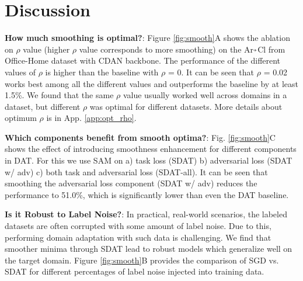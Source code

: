 \documentclass[table,dvipsnames]{article}
\newcommand{\veryshortarrow}[1][3pt]{\mathrel{\hbox{\rule[\dimexpr\fontdimen22\textfont2-.2pt\relax]{#1}{.4pt}}\mkern-4mu\hbox{\usefont{U}{lasy}{m}{n}\symbol{41}}}} \newcommand{\cmark}{\ding{51}}\newcommand{\xmark}{\ding{55}}\usepackage{amssymb}\usepackage{pifont}\usepackage[hyphens]{url}
\theoremstyle{plain}
\theoremstyle{definition}
\theoremstyle{remark}
\begin{document}
\section{Discussion}
\label{sec:discussion}
\textbf{How much smoothing is optimal?}: Figure \ref{fig:smooth}\textcolor{mydarkblue}{A} shows the ablation on $\rho$ value (higher $\rho$ value corresponds to more smoothing) on the Ar$\veryshortarrow$Cl from Office-Home dataset with CDAN backbone. The performance of the different values of $\rho$ is higher than the baseline with $\rho$ = 0. It can be seen that $\rho$ = 0.02 works best among all the different values and outperforms the baseline by at least 1.5\%. We found that the same $\rho$ value usually worked well across domains in a dataset, but different $\rho$ was optimal for different datasets. More details about optimum $\rho$ is in App. \ref{app:opt_rho}.

\textbf{Which components benefit from smooth optima?}:
Fig. \ref{fig:smooth}C shows the effect of introducing smoothness enhancement for different components in DAT.
For this we use SAM on a) task loss (SDAT) b) adversarial loss (SDAT w/ adv) c) both task and adversarial loss (SDAT-all). It can be seen that smoothing the adversarial loss component (SDAT w/ adv) reduces the performance to 51.0\%, which is significantly lower than even the DAT baseline.

\textbf{Is it Robust to Label Noise?}: In practical, real-world scenarios, the labeled datasets are often corrupted with some amount of label noise. Due to this, performing domain adaptation with such data is challenging. We find that smoother minima through SDAT lead to robust models which generalize well on the target domain. Figure \ref{fig:smooth}\textcolor{mydarkblue}{B} provides the comparison of SGD vs. SDAT for different percentages of label noise injected into training data.
\end{document}
